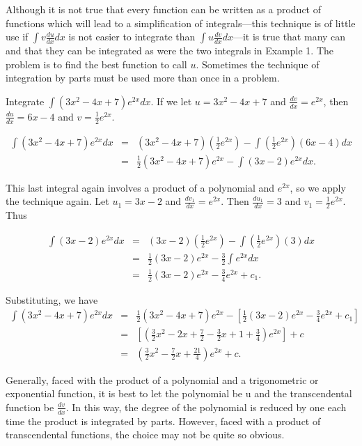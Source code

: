 Although it is not true that every function can be written as a product of functions which will lead to a simplification of integrals---this technique is of little use if $\int v \frac{du}{dx} dx$ is not easier to integrate than $\int u \frac{dv}{dx} dx$---it is true that many can and that they can be integrated as were the two integrals in Example 1. 
The problem is to find the best function to call $u$. Sometimes the technique of integration by parts must be used more than once in a problem.


\begin{example} 
Integrate $\int (3x^2 - 4x + 7) e^{2x} dx$. If we let $u = 3x^2 - 4x + 7$ and 
$\frac{dv}{dx} = e^{2x}$, then $\frac{du}{dx} = 6x - 4$ and $v = \frac{1}{2}e^{2x}$.

\begin{eqnarray*}
\int (3x^2 - 4x + 7)e^{2x} dx 
&=& (3x^2 - 4x + 7)(\frac{1}{2}e^{2x}) - \int (\frac{1}{2} e^{2x})(6x - 4) dx\\
&=& \frac{1}{2}(3x^2 - 4x + 7)e^{2x} - \int (3x - 2)e^{2x}dx.
\end{eqnarray*}

\noindent This last integral again involves a product of a polynomial and $e^{2x}$, so we apply the technique again. Let $u_1 = 3x - 2$ and $\frac{dv_1}{dx} = e^{2x}$.
Then $\frac{du_1}{dx} = 3$ and $v_1 = \frac{1}{2}e^{2x}$. Thus  

\begin{eqnarray*}
\int (3x - 2)e^{2x} dx 
&=& (3x - 2)(\frac{1}{2}e^{2x}) - \int (\frac{1}{2}e^{2x})(3) dx \\
&=& \frac{1}{2} (3x - 2)e^{2x} - \frac{3}{2} \int e^{2x}dx  \\
&=& \frac{1}{2} (3x - 2)e^{2x} - \frac{3}{4}e^{2x} + c_1. 
\end{eqnarray*}

\noindent Substituting, we have
\begin{eqnarray*}
\int (3x^2 - 4x + 7)e^{2x}dx
&=& \frac{1}{2}(3x^2 - 4x + 7)e^{2x} - [\frac{1}{2}(3x - 2)e^{2x} - \frac{3}{4} e^{2x} + c_1] \\
&=& [(\frac{3}{2}x^2 - 2x + \frac{7}{2} - \frac{3}{2}x + 1 + \frac{3}{4})e^{2x} ] + c\\
&=& (\frac{3}{2} x^2 - \frac{7}{2} x + \frac{21}{4})e^{2x} + c.
\end{eqnarray*}
\end{example}


Generally, faced with the product of a polynomial and a trigonometric or exponential function, it is best to let the polynomial be u and the transcendental function be $\frac{dv}{dx}$. In this way, the degree of the polynomial is reduced by one each time the product is integrated by parts. However, faced with a product of transcendental functions, the choice may not be quite so obvious.

